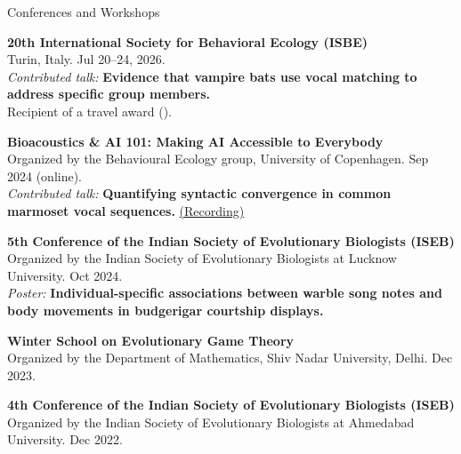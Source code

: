 \documentclass{resume}
\begin{document}
\begin{rSection}{Conferences and Workshops}
\item {\bf 20th International Society for Behavioral Ecology (ISBE)} \\
Turin, Italy. Jul 20--24, 2026.\\
{\it Contributed talk:} {\bf Evidence that vampire bats use vocal matching to address specific group members.}\\
Recipient of a travel award ().

\item {\bf Bioacoustics \& AI 101: Making AI Accessible to Everybody} \\
Organized by the Behavioural Ecology group, University of Copenhagen. Sep 2024 (online).\\
{\it Contributed talk:} {\bf Quantifying syntactic convergence in common marmoset vocal sequences.}
\href{https://www.youtube.com/watch?v=bZplC_TDW1M}{(Recording)}

\item {\bf 5th Conference of the Indian Society of Evolutionary Biologists (ISEB)} \\
Organized by the Indian Society of Evolutionary Biologists at Lucknow University. Oct 2024.\\
{\it Poster:} {\bf Individual-specific associations between warble song notes and body movements in budgerigar courtship displays.}

\item {\bf Winter School on Evolutionary Game Theory} \\
Organized by the Department of Mathematics, Shiv Nadar University, Delhi. Dec 2023.

\item {\bf 4th Conference of the Indian Society of Evolutionary Biologists (ISEB)} \\
Organized by the Indian Society of Evolutionary Biologists at Ahmedabad University. Dec 2022.
\end{rSection}
\end{document}
